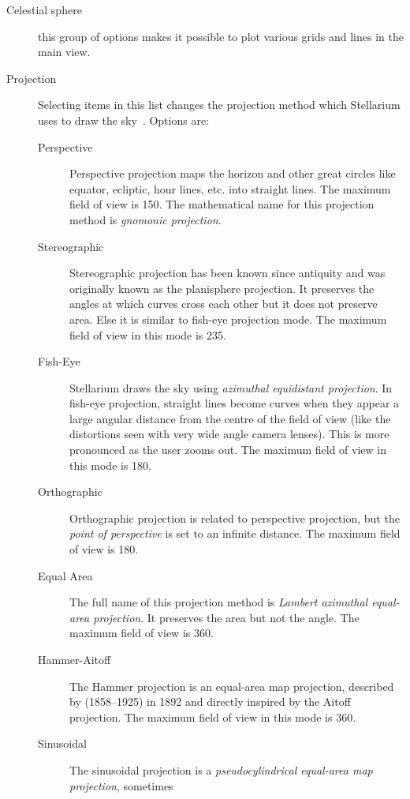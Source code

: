 \begin{description}
\item[Celestial sphere] this group of options makes it possible to
  plot various grids and lines in the main view.
\item[Projection] Selecting items in this list changes the
  projection method which Stellarium uses to draw the sky~\cite{Snyder:MapProjections}. Options are:

  \begin{description}
  \item[Perspective] Perspective projection maps the horizon and other
    great circles like equator, ecliptic, hour lines, etc. into
    straight lines. The maximum field of view is 150\degree. The
    mathematical name for this projection method is \emph{gnomonic
      projection}.
  \item[Stereographic] Stereographic projection has been known since
    antiquity and was originally known as the planisphere
    projection. It preserves the angles at which curves cross each
    other but it does not preserve area. Else it is similar to
    fish-eye projection mode. The maximum field of view in this mode
    is 235\degree.
  \item[Fish-Eye] Stellarium draws the sky using \emph{azimuthal
    equidistant projection}. In fish-eye projection, straight lines
    become curves when they appear a large angular distance from the
    centre of the field of view (like the distortions seen with very
    wide angle camera lenses). This is more pronounced as the user zooms
    out. The maximum field of view in this mode is 180\degree.
  \item[Orthographic] Orthographic projection is related to
    perspective projection, but the \emph{point of perspective} is set
    to an infinite distance. The maximum field of view is 180\degree.
  \item[Equal Area] The full name of this projection method is
    \emph{Lambert azimuthal equal-area projection}. It preserves the
    area but not the angle. The maximum field of view is 360\degree.
  \item[Hammer-Aitoff] The Hammer projection is an equal-area map
    projection, described by  (1858--1925) in 1892 and directly inspired
    by the Aitoff projection. The maximum field of view in this mode is
    360\degree.
  \item[Sinusoidal] The sinusoidal projection is a
    \emph{pseudocylindrical equal-area map projection}, sometimes

\end{description}
\end{description}

